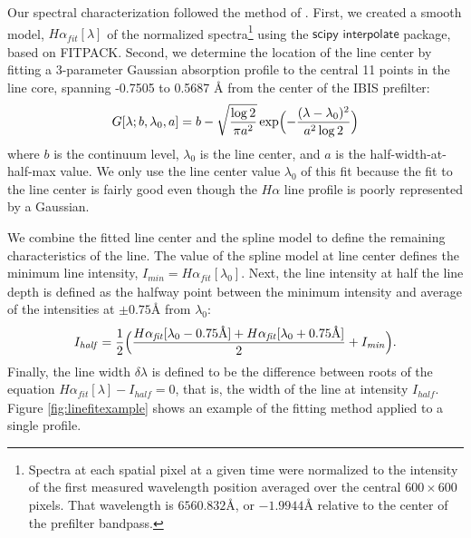 \documentclass[twocolumn]{aastex62}
\newcommand{\figref}[1]{Figure \ref{#1}}
\newcommand{\code}[1]{\ensuremath{\textsf{#1}}}
\newcommand{\scipy}{\code{scipy}}
\newcommand{\fnc}[1]{\code{#1}}
\newcommand{\halpha}{\ensuremath{H\alpha}}
\newcommand{\hfit}{\ensuremath{\halpha_\mathit{fit} }}
\newcommand{\linecenter}{\ensuremath{\lambda_0}}
\newcommand{\linew}{\ensuremath{\delta \lambda}}
\newcommand{\imin}{\ensuremath{I_\mathit{min}}}
\newcommand{\ihalf}{\ensuremath{I_\mathit{half}}}
\begin{document}
Our spectral characterization followed the method of \citet{2009Cauzzi}.
First, we created a smooth model, $\hfit[\lambda]$ of the normalized spectra\footnote{Spectra at each spatial pixel at a given time were normalized to the intensity of the first measured wavelength position averaged over the central $600\times600$ pixels.  That wavelength is $6560.832$\AA{}, or $-1.9944$\AA{} relative to the center of the prefilter bandpass.} using the \scipy{} \fnc{interpolate} package, based on FITPACK.  
Second, we determine the location of the line center by fitting a 3-parameter Gaussian absorption profile to the central 11 points in the line core, spanning -0.7505 to 0.5687 \AA{} from the center of the IBIS prefilter:
\begin{equation}
    G[\lambda; b, \linecenter, a] = b- \sqrt{\frac{\log2}{\pi a^2}}\exp\Bigl(-\frac{(\lambda - \linecenter)^2}{a^2\log2}\Bigr)
\end{equation}
where $b$ is the continuum level, $\linecenter$ is the line center, and $a$ is the half-width-at-half-max value.  
We only use the line center value $\lambda_0$ of this fit because the fit to the line center is fairly good even though the \halpha{} line profile is poorly represented by a Gaussian.  \par

We combine the fitted line center and the spline model to define the remaining characteristics of the line.  
The value of the spline model at line center defines the minimum line intensity, $\imin{}=\hfit[\linecenter{}]$.  
Next, the line intensity at half the line depth is defined as the halfway point between the minimum intensity and average of the intensities at $\pm0.75$\AA{} from \linecenter{}: 
\begin{equation}
    \ihalf = \frac{1}{2}\Bigl(\frac{\hfit[\linecenter-0.75\text{\AA{}}]+\hfit[\linecenter+0.75\text{\AA{}}]}{2}+\imin \Bigr).
\end{equation}
Finally, the line width \linew{} is defined to be the difference between roots of the equation \mbox{$\hfit[\lambda]-\ihalf = 0$}, that is, the width of the line at intensity \ihalf.
\figref{fig:linefitexample} shows an example of the fitting method applied to a single profile.\par
\end{document}
